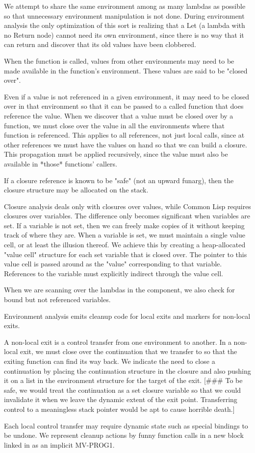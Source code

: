 We attempt to share the same environment among as many lambdas as possible so
that unnecessary environment manipulation is not done.  During environment
analysis the only optimization of this sort is realizing that a Let (a lambda
with no Return node) cannot need its own environment, since there is no way
that it can return and discover that its old values have been clobbered.

When the function is called, values from other environments may need to be made
available in the function's environment.  These values are said to be "closed
over".

Even if a value is not referenced in a given environment, it may need to be
closed over in that environment so that it can be passed to a called function
that does reference the value.  When we discover that a value must be closed
over by a function, we must close over the value in all the environments where
that function is referenced.  This applies to all references, not just local
calls, since at other references we must have the values on hand so that we can
build a closure.  This propagation must be applied recursively, since the value
must also be available in *those* functions' callers.

If a closure reference is known to be "safe" (not an upward funarg), then the
closure structure may be allocated on the stack.

Closure analysis deals only with closures over values, while Common Lisp
requires closures over variables.  The difference only becomes significant when
variables are set.  If a variable is not set, then we can freely make copies of
it without keeping track of where they are.  When a variable is set, we must
maintain a single value cell, or at least the illusion thereof.  We achieve
this by creating a heap-allocated "value cell" structure for each set variable
that is closed over.  The pointer to this value cell is passed around as the
"value" corresponding to that variable.  References to the variable must
explicitly indirect through the value cell.

When we are scanning over the lambdas in the component, we also check for bound
but not referenced variables.

Environment analysis emits cleanup code for local exits and markers for
non-local exits.

A non-local exit is a control transfer from one environment to another.  In a
non-local exit, we must close over the continuation that we transfer to so that
the exiting function can find its way back.  We indicate the need to close a
continuation by placing the continuation structure in the closure and also
pushing it on a list in the environment structure for the target of the exit.
[\#\#\# To be safe, we would treat the continuation as a set closure variable so
that we could invalidate it when we leave the dynamic extent of the exit point.
Transferring control to a meaningless stack pointer would be apt to cause
horrible death.]

Each local control transfer may require dynamic state such as special bindings
to be undone.  We represent cleanup actions by funny function calls in a new
block linked in as an implicit MV-PROG1.

